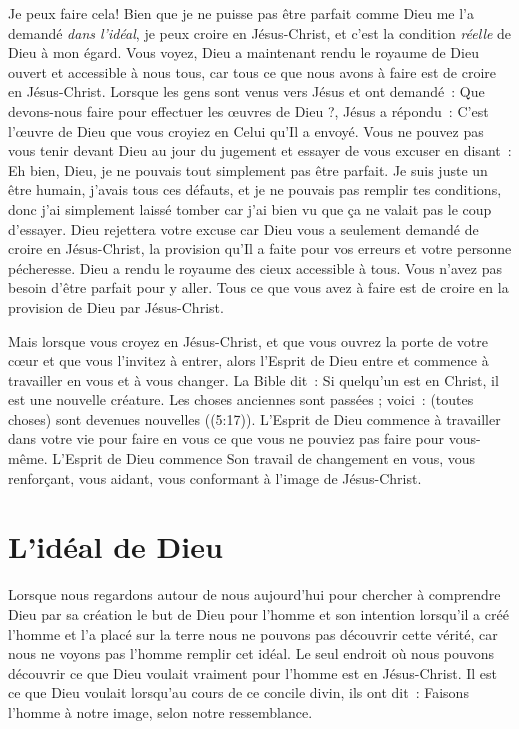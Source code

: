 Je peux faire cela!
 Bien que je ne puisse pas être parfait
 comme Dieu me l'a demandé \emph{dans l'idéal},
 je peux croire en Jésus-Christ,
 et c'est la condition \emph{réelle} de Dieu à mon égard.
 Vous voyez, Dieu a maintenant rendu le royaume de Dieu ouvert
 et accessible à nous tous, car tous ce que nous avons à faire
 est de croire en Jésus-Christ.
 Lorsque les gens sont venus vers Jésus et ont demandé~:
 \og Que devons-nous faire pour effectuer les œuvres de Dieu ?\fg{},
 Jésus a répondu~:
 \og C'est l'œuvre de Dieu que vous croyiez en Celui qu'Il a envoyé. \fg{}
 Vous ne pouvez pas vous tenir devant Dieu au jour du jugement
 et essayer de vous excuser en disant~:
 \og Eh bien, Dieu, je ne pouvais tout simplement pas être parfait.
 Je suis juste un être humain, j'avais tous ces défauts,
 et je ne pouvais pas remplir tes conditions,
 donc j'ai simplement laissé tomber car j'ai bien vu
 que ça ne valait pas le coup d'essayer. \fg{}
 Dieu rejettera votre excuse car Dieu vous a seulement demandé
 de croire en Jésus-Christ, la provision qu'Il a faite pour vos erreurs
 et votre personne pécheresse.
 Dieu a rendu le royaume des cieux accessible à tous.
 Vous n'avez pas besoin d'être parfait pour y aller.
 Tous ce que vous avez à faire est de croire en la provision
 de Dieu par Jésus-Christ.

Mais lorsque vous croyez en Jésus-Christ,
 et que vous ouvrez la porte de votre cœur
 et que vous l'invitez à entrer,
 alors l'Esprit de Dieu entre et commence à travailler en vous
 et à vous changer.
 La Bible dit~:
 \og Si quelqu'un est en Christ, il est une nouvelle créature.
 Les choses anciennes sont passées ; voici~: (toutes choses)
 sont devenues nouvelles \fg{} ((5:17)).
 L'Esprit de Dieu commence à travailler dans votre vie pour faire
 en vous ce que vous ne pouviez pas faire pour vous-même.
 L'Esprit de Dieu commence Son travail de changement en vous,
 vous renforçant, vous aidant, vous conformant à l'image de Jésus-Christ.


\section*{L'idéal de Dieu}

Lorsque nous regardons autour de nous aujourd'hui pour chercher
 à comprendre Dieu par sa création
 \ocadr le but de Dieu pour l'homme et son intention
 lorsqu'il a créé l'homme et l'a placé sur la terre \fcadr{}
 nous ne pouvons pas découvrir cette vérité,
 car nous ne voyons pas l'homme remplir cet idéal.
 Le seul endroit où nous pouvons découvrir ce que Dieu voulait vraiment
 pour l'homme est en Jésus-Christ.
 Il est ce que Dieu voulait lorsqu'au cours de ce concile divin, ils ont dit~:
 \og Faisons l'homme à notre image, selon notre ressemblance. \fg{}

